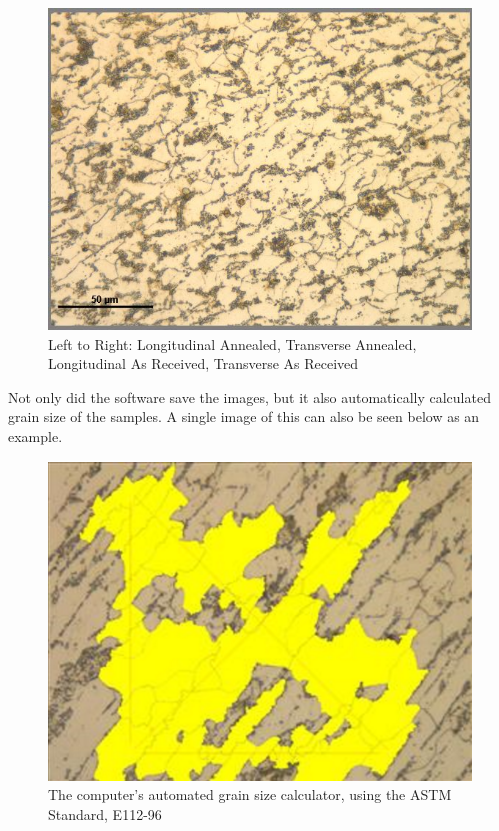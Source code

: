 \documentclass{article}
\begin{document}
\begin{figure}[h]
\begin{minipage}{0.24\textwidth}
	\end{minipage}
	\begin{minipage}{0.24\textwidth}
		\centering
		\includegraphics[scale=.21]{TARSteelGrains.jpg}
	\end{minipage}
	\caption{Left to Right: Longitudinal Annealed, Transverse Annealed, Longitudinal As Received, Transverse As Received}
\end{figure}

Not only did the software save the images, but it also automatically calculated grain size of the samples. A single image of this can also be seen below as an example.

\begin{figure}[h]
	\centering
	\includegraphics[scale=.5]{compLASteelGrains.png}
	\caption{The computer's automated grain size calculator, using the ASTM Standard, E112-96}
\end{figure}
\end{document}
